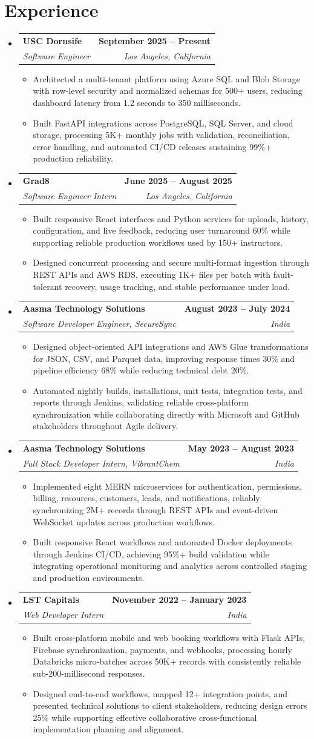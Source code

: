\documentclass[letterpaper,10pt]{article}
\makeatletter
\newcommand{\itemTail}{\vspace{-4pt}}
\newcommand{\sectionGap}{\vspace{-8pt}}
\newcommand{\roleGap}{\vspace{2pt}}
\newcommand{\resumeItem}[1]{\item\small{{#1 \itemTail}}}
\newcommand{\resumeSubheading}[4]{\vspace{-1pt}\item\begin{tabular*}{1.0\textwidth}[t]{l@{\extracolsep{\fill}}r}\textbf{#1} & \textbf{\small #2} \\\textit{\small#3} & \textit{\small #4} \\\end{tabular*}\vspace{-2pt}}
\newcommand{\resumeSubHeadingListStart}{\begin{itemize}[leftmargin=0.0in, label={}]}
\newcommand{\resumeSubHeadingListEnd}{\end{itemize}}
\newcommand{\resumeItemListStart}{\begin{itemize}[leftmargin=0.15in,label=\textbullet,itemsep=3pt,topsep=0pt,parsep=0pt,partopsep=0pt]}
\newcommand{\resumeItemListEnd}{\end{itemize}\vspace{-4pt}}
\makeatother
\begin{document}
\section{Experience}
\resumeSubHeadingListStart
\resumeSubheading{USC Dornsife}{September 2025 -- Present}{Software Engineer}{Los Angeles, California}
\resumeItemListStart
\resumeItem{Architected a multi-tenant platform using Azure SQL and Blob Storage with row-level security and normalized schemas for 500+ users, reducing dashboard latency from 1.2 seconds to 350 milliseconds.}
\resumeItem{Built FastAPI integrations across PostgreSQL, SQL Server, and cloud storage, processing 5K+ monthly jobs with validation, reconciliation, error handling, and automated CI/CD releases sustaining 99\%+ production reliability.}
\resumeItemListEnd
\roleGap
\resumeSubheading{Grad8}{June 2025 -- August 2025}{Software Engineer Intern}{Los Angeles, California}
\resumeItemListStart
\resumeItem{Built responsive React interfaces and Python services for uploads, history, configuration, and live feedback, reducing user turnaround 60\% while supporting reliable production workflows used by 150+ instructors.}
\resumeItem{Designed concurrent processing and secure multi-format ingestion through REST APIs and AWS RDS, executing 1K+ files per batch with fault-tolerant recovery, usage tracking, and stable performance under load.}
\resumeItemListEnd
\roleGap
\resumeSubheading{Aasma Technology Solutions}{August 2023 -- July 2024}{Software Developer Engineer, SecureSync}{India}
\resumeItemListStart
\resumeItem{Designed object-oriented API integrations and AWS Glue transformations for JSON, CSV, and Parquet data, improving response times 30\% and pipeline efficiency 68\% while reducing technical debt 20\%.}
\resumeItem{Automated nightly builds, installations, unit tests, integration tests, and reports through Jenkins, validating reliable cross-platform synchronization while collaborating directly with Microsoft and GitHub stakeholders throughout Agile delivery.}
\resumeItemListEnd
\roleGap
\resumeSubheading{Aasma Technology Solutions}{May 2023 -- August 2023}{Full Stack Developer Intern, VibrantChem}{India}
\resumeItemListStart
\resumeItem{Implemented eight MERN microservices for authentication, permissions, billing, resources, customers, leads, and notifications, reliably synchronizing 2M+ records through REST APIs and event-driven WebSocket updates across production workflows.}
\resumeItem{Built responsive React workflows and automated Docker deployments through Jenkins CI/CD, achieving 95\%+ build validation while integrating operational monitoring and analytics across controlled staging and production environments.}
\resumeItemListEnd
\roleGap
\resumeSubheading{LST Capitals}{November 2022 -- January 2023}{Web Developer Intern}{India}
\resumeItemListStart
\resumeItem{Built cross-platform mobile and web booking workflows with Flask APIs, Firebase synchronization, payments, and webhooks, processing hourly Databricks micro-batches across 50K+ records with consistently reliable sub-200-millisecond responses.}
\resumeItem{Designed end-to-end workflows, mapped 12+ integration points, and presented technical solutions to client stakeholders, reducing design errors 25\% while supporting effective collaborative cross-functional implementation planning and alignment.}
\resumeItemListEnd
\resumeSubHeadingListEnd
\sectionGap
\end{document}
